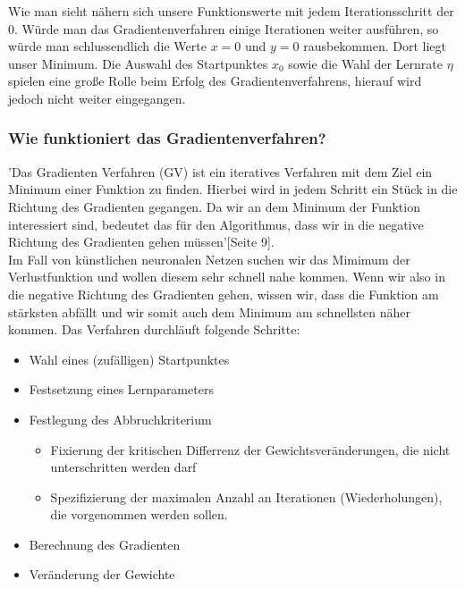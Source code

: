   Wie man sieht nähern sich unsere Funktionswerte mit jedem Iterationsschritt
  der 0. Würde man das Gradientenverfahren einige Iterationen weiter ausführen, so 
  würde man schlussendlich die Werte $x = 0$ und $y = 0$ rausbekommen. Dort liegt unser Minimum.
  \bigbreak\noindent
  Die Auswahl des Startpunktes $x_{0}$ sowie die Wahl der Lernrate $\eta$ spielen eine große Rolle beim Erfolg des
  Gradientenverfahrens, hierauf wird jedoch nicht weiter eingegangen.
\iffalse
\subsubsection{Wie funktioniert das Gradientenverfahren?}\label{subsec:gradientenverfahren:wie_funktioniert}
'Das Gradienten Verfahren (GV) ist ein iteratives Verfahren mit dem Ziel ein Minimum einer Funktion zu finden. Hierbei wird in jedem Schritt ein Stück in die Richtung des Gradienten
gegangen. Da wir an dem Minimum der Funktion interessiert sind, bedeutet das für den Algorithmus, dass wir in die negative Richtung des Gradienten gehen müssen'\cite{LH21}[Seite 9].
\\
Im Fall von künstlichen neuronalen Netzen suchen wir das Mimimum der Verlustfunktion und wollen diesem sehr schnell nahe kommen.
Wenn wir also in die negative Richtung des Gradienten gehen, wissen wir, dass die Funktion am stärksten abfällt und wir somit auch dem Minimum am schnellsten näher kommen. Das Verfahren durchläuft folgende Schritte:
  \begin{itemize}
    \item Wahl eines (zufälligen) Startpunktes
  \end{itemize}
  \begin{itemize}
    \item Festsetzung eines Lernparameters
  \end{itemize}
  \begin{itemize}
    \item Festlegung des Abbruchkriterium
    \begin{itemize}
    \item Fixierung der kritischen Differrenz der Gewichtsveränderungen, die nicht unterschritten werden darf
    \item Spezifizierung der maximalen Anzahl an Iterationen (Wiederholungen), die vorgenommen werden sollen.
    \end{itemize}
  \end{itemize}
  \begin{itemize}
    \item  Berechnung des Gradienten
  \end{itemize}
  \begin{itemize}
    \item Veränderung der Gewichte
  \end{itemize}

